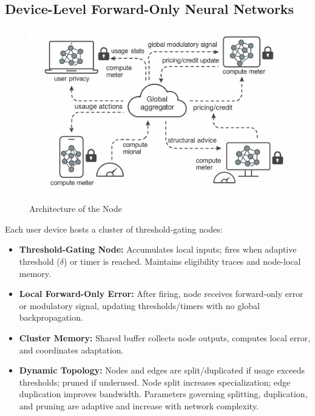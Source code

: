\documentclass[11pt]{article}
\begin{document}
\subsection{Device-Level Forward-Only Neural Networks}
\begin{figure}
    \centering
    \includegraphics[width=0.6\linewidth]{architecture_diagrams/48db0a56-63a0-40ef-9322-787cc6e465d9.png}
    \caption{Architecture of the Node}
    \label{fig:enter-label}
\end{figure}
Each user device hosts a cluster of threshold-gating nodes:
\begin{itemize}
    \item \textbf{Threshold-Gating Node:} Accumulates local inputs; fires when adaptive threshold (\(\delta\)) or timer is reached. Maintains eligibility traces and node-local memory.
    \item \textbf{Local Forward-Only Error:} After firing, node receives forward-only error or modulatory signal, updating thresholds/timers with no global backpropagation.
    \item \textbf{Cluster Memory:} Shared buffer collects node outputs, computes local error, and coordinates adaptation.
    \item \textbf{Dynamic Topology:} Nodes and edges are split/duplicated if usage exceeds thresholds; pruned if underused. Node split increases specialization; edge duplication improves bandwidth. Parameters governing splitting, duplication, and pruning are adaptive and increase with network complexity.
\end{itemize}
\end{document}
